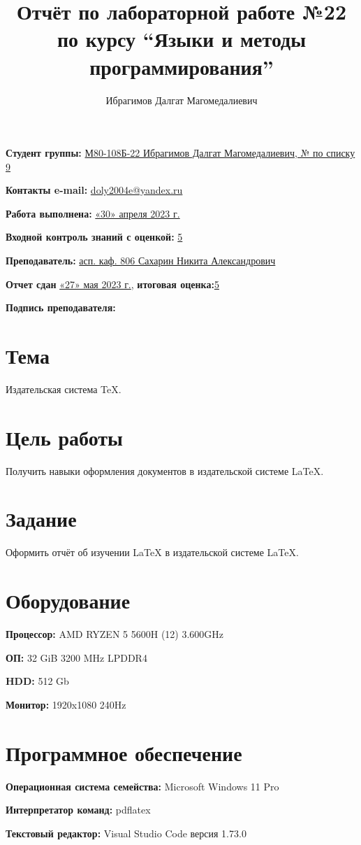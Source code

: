 \documentclass[12pt, letterpaper]{article}
\title{Отчёт по лабораторной работе №22 по курсу “Языки и методы программирования”}
\author{Ибрагимов Далгат Магомедалиевич}
\begin{document}
\maketitle
\begin{description}
\item\textbf{Студент группы:} \underline{М80-108Б-22 Ибрагимов Далгат Магомедалиевич, № по списку 9}    
\item\textbf{Контакты e-mail:} \underline{doly2004e@yandex.ru}
\item\textbf{Работа выполнена:} \underline{«30» апреля 2023 г.}
\item\textbf{Входной контроль знаний с оценкой:} \underline{5}
\item\textbf{Преподаватель:} \underline{асп. каф. 806 Сахарин Никита Александрович}
\item\textbf{Отчет сдан} \underline{«27» мая 2023 г.}, \textbf{итоговая оценка:}\underline{5}
\item\textbf{Подпись преподавателя:} \underline{\hspace{3cm}}
\end{description}
\newpage
\section{Тема}
Издательская система \TeX{}.
\section{Цель работы}
Получить навыки оформления документов в издательской системе \LaTeX{}.
\section{Задание}
Оформить отчёт об изучении \LaTeX{} в издательской системе \LaTeX{}.
\section{Оборудование}
\begin{description}
\item\textbf{Процессор:} AMD RYZEN 5 5600H (12) 3.600GHz
\item\textbf{ОП:} 32 GiB 3200 MHz LPDDR4
\item\textbf{HDD:} 512 Gb
\item\textbf{Монитор:} 1920x1080 240Hz
\end{description}
\section{Программное обеспечение}
\begin{description}
\item\textbf{Операционная система семейства:} Microsoft Windows 11 Pro
\item\textbf{Интерпретатор команд:} pdflatex
\item\textbf{Текстовый редактор:} Visual Studio Code версия 1.73.0
\end{description}
\end{document}
